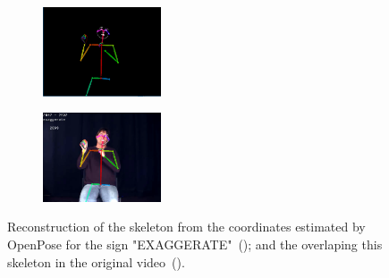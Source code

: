 
\begin{figure}
    \centering
    \begin{subfigure}{3.5cm}
        \centering
        \includegraphics[width=3.5cm]{images/sign_pose}
        \caption{}
        \label{fig:sign-pose-skeleton}
    \end{subfigure}
    \begin{subfigure}{3.5cm}
      \centering
      \includegraphics[width=3.5cm]{images/sign_pose_blended}
      \caption{}
      \label{fig:sign-pose-blended}
    \end{subfigure}
    \caption{
        Reconstruction of the skeleton from the coordinates estimated by OpenPose for the sign "EXAGGERATE"~(); and the overlaping this skeleton in the original video~().
    }
    \label{fig:sign-pose}
\end{figure}

\vspace{-4mm}

    
